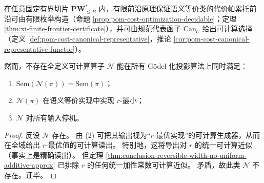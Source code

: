 \begin{theorem}[有界切片可计算最优与全域最优综合器不可延拓]\label{thm:conclusion-slice-computable-global-optimal-synthesizer-impossible}
在任意固定有界切片 \(\mathbf{PW}^{\ast}_{\le B}\) 内，有限前沿原理保证语义等价类的代价帕累托前沿可由有限枚举构造（命题 \ref{prop:pom-cost-optimization-decidable}；定理 \ref{thm:xi-finite-frontier-certificate}），并可由规范代表函子 \(\mathrm{Can}_{\mathcal C}\) 给出可计算选择（定义 \ref{def:pom-cost-canonical-representative}，推论 \ref{cor:pom-cost-canonical-representative-functor}）。

然而，不存在全定义可计算算子 \(\mathcal N\) 能在所有 Gödel 化投影算法上同时满足：
\begin{enumerate}
  \item \(\mathrm{Sem}(\mathcal N(\pi))=\mathrm{Sem}(\pi)\)；
  \item \(\mathcal N(\pi)\) 在语义等价实现中实现 \(r\)-最小；
  \item \(\mathcal N\) 对所有输入停机。
\end{enumerate}
\end{theorem}
\begin{proof}
反设 \(\mathcal N\) 存在。
由 (2) 可把其输出视为“\(r\)-最优实现”的可计算生成器，从而在全域给出 \(r\)-最优值的可计算读出。
特别地，这将导出对 \(r\) 的统一可计算近似（事实上是精确读出）。
但定理 \ref{thm:conclusion-reversible-width-no-uniform-additive-approx} 已排除 \(r\) 的任何统一加性常数可计算近似。
矛盾，故此类 \(\mathcal N\) 不存在。证毕。
\end{proof}



